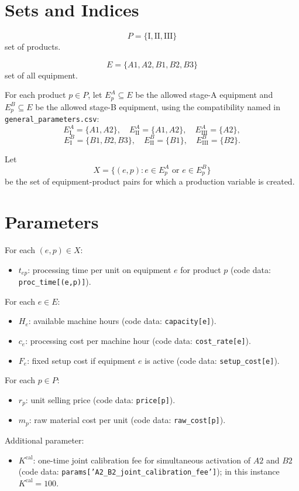 \section*{Sets and Indices}

\[
P=\{\mathrm{I},\mathrm{II},\mathrm{III}\}
\]
set of products.

\[
E=\{A1,A2,B1,B2,B3\}
\]
set of all equipment.

For each product \(p\in P\), let \(E^A_p\subseteq E\) be the allowed stage-A equipment and \(E^B_p\subseteq E\) be the allowed stage-B equipment, using the compatibility named in \texttt{general\_parameters.csv}:
\[
E^A_{\mathrm{I}}=\{A1,A2\},\quad
E^A_{\mathrm{II}}=\{A1,A2\},\quad
E^A_{\mathrm{III}}=\{A2\},
\]
\[
E^B_{\mathrm{I}}=\{B1,B2,B3\},\quad
E^B_{\mathrm{II}}=\{B1\},\quad
E^B_{\mathrm{III}}=\{B2\}.
\]

Let
\[
X=\{(e,p): e\in E^A_p \text{ or } e\in E^B_p\}
\]
be the set of equipment-product pairs for which a production variable is created.

\section*{Parameters}

For each \((e,p)\in X\):
\begin{itemize}
\item \(t_{ep}\): processing time per unit on equipment \(e\) for product \(p\) (code data: \texttt{proc\_time[(e,p)]}).
\end{itemize}

For each \(e\in E\):
\begin{itemize}
\item \(H_e\): available machine hours (code data: \texttt{capacity[e]}).
\item \(c_e\): processing cost per machine hour (code data: \texttt{cost\_rate[e]}).
\item \(F_e\): fixed setup cost if equipment \(e\) is active (code data: \texttt{setup\_cost[e]}).
\end{itemize}

For each \(p\in P\):
\begin{itemize}
\item \(r_p\): unit selling price (code data: \texttt{price[p]}).
\item \(m_p\): raw material cost per unit (code data: \texttt{raw\_cost[p]}).
\end{itemize}

Additional parameter:
\begin{itemize}
\item \(K^{\mathrm{cal}}\): one-time joint calibration fee for simultaneous activation of \(A2\) and \(B2\) (code data: \texttt{params['A2\_B2\_joint\_calibration\_fee']}); in this instance \(K^{\mathrm{cal}}=100\).
\end{itemize}

